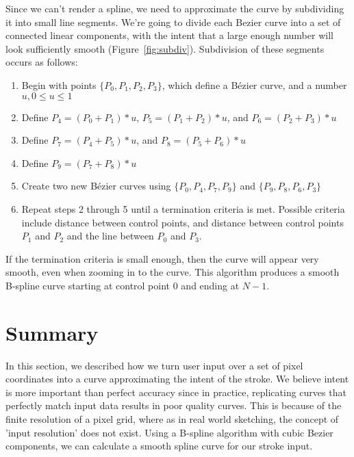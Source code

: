 Since we can't render a spline, we need to approximate the curve by subdividing it into small line segments.
We're going to divide each Bezier curve into a set of connected linear components, with the intent that a large enough number will look sufficiently smooth (Figure~\ref{fig:subdiv}).
Subdivision of these segments occurs as follows:
\begin{enumerate}
\item Begin with points $\{P_0,P_1,P_2,P_3\}$, which define a Bézier curve, and a number $u, 0 \le u \le 1$
\item Define $P_4=(P_0 + P_1)*u$, $P_5=(P_1 + P_2)*u$, and $P_6=(P_2 + P_3)*u$
\item Define $P_7=(P_4 + P_5)*u$, and $P_8=(P_5 + P_6)*u$
\item Define $P_9=(P_7 + P_8)*u$
\item Create two new Bézier curves using $\{P_0,P_4,P_7,P_9\}$ and $\{P_9,P_8,P_6,P_3\}$
\item Repeat steps 2 through 5 until a termination criteria is met. Possible criteria include distance between control points, and distance between control points $P_1$ and $P_2$ and the line between $P_0$ and $P_3$.
\end{enumerate}
If the termination criteria is small enough, then the curve will appear very smooth, even when zooming in to the curve.
This algorithm produces a smooth B-spline curve starting at control point 0 and ending at $N-1$.

\section{Summary}
In this section, we described how we turn user input over a set of pixel coordinates into a curve approximating the intent of the stroke.
We believe intent is more important than perfect accuracy since in practice, replicating curves that perfectly match input data results in poor quality curves.
This is because of the finite resolution of a pixel grid, where as in real world sketching, the concept of 'input resolution' does not exist.
Using a B-spline algorithm with cubic Bezier components, we can calculate a smooth spline curve for our stroke input.